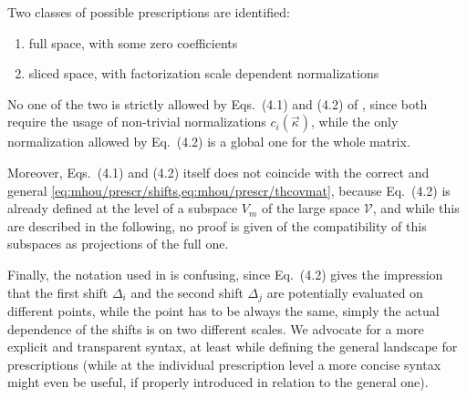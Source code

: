 Two classes of possible prescriptions are identified:

\begin{enumerate}
    \item full space, with some zero coefficients
    \item sliced space, with factorization scale dependent normalizations
\end{enumerate}

No one of the two is strictly allowed by Eqs.\ (4.1) and (4.2) of
\cite{NNPDF:2019ubu}, since both require the usage of non-trivial
normalizations $c_i(\vec{\kappa})$, while the only normalization allowed by
Eq.\ (4.2) is a global one for the whole matrix.

Moreover, Eqs.\ (4.1) and (4.2) itself does not coincide with the correct and
general \cref{eq:mhou/prescr/shifts,eq:mhou/prescr/thcovmat}, because Eq.\
(4.2) is already defined at the level of a subspace $V_m$ of the large space
$\mathcal{V}$, and while this are described in the following, no proof is given
of the compatibility of this subspaces as projections of the full one.

Finally, the notation used in \cite{NNPDF:2019ubu} is confusing, since Eq.\
(4.2) gives the impression that the first shift $\Delta_i$ and the second shift
$\Delta_j$ are potentially evaluated on different points, while the point has
to be always the same, simply the actual dependence of the shifts is on two
different scales.
We advocate for a more explicit and transparent syntax, at least while defining
the general landscape for prescriptions (while at the individual prescription
level a more concise syntax might even be useful, if properly introduced in
relation to the general one).

